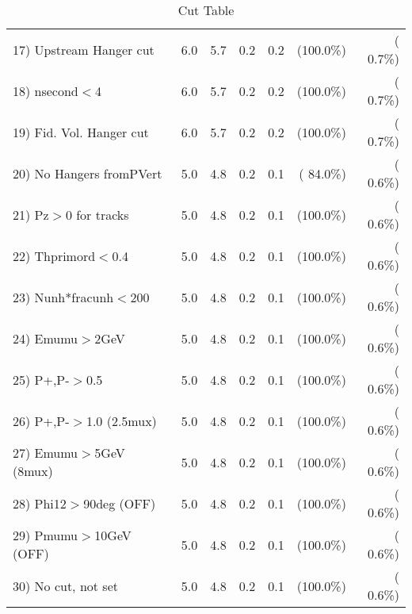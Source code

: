 \begin{table}[h!]
\begin{tabular}{||l||r|r|r|r|r|r||}
 17) Upstream Hanger cut  &          6.0 &          5.7 &          0.2 &          0.2 & (100.0\%) & (  0.7\%) \\
 18) nsecond$<$4          &          6.0 &          5.7 &          0.2 &          0.2 & (100.0\%) & (  0.7\%) \\
 19) Fid. Vol. Hanger cut &          6.0 &          5.7 &          0.2 &          0.2 & (100.0\%) & (  0.7\%) \\
 20) No Hangers fromPVert &          5.0 &          4.8 &          0.2 &          0.1 & ( 84.0\%) & (  0.6\%) \\
 21) Pz$>$0 for tracks    &          5.0 &          4.8 &          0.2 &          0.1 & (100.0\%) & (  0.6\%) \\
 22) Thprimord$<$0.4      &          5.0 &          4.8 &          0.2 &          0.1 & (100.0\%) & (  0.6\%) \\
 23) Nunh*fracunh$<$200   &          5.0 &          4.8 &          0.2 &          0.1 & (100.0\%) & (  0.6\%) \\
 24) Emumu$>$2GeV         &          5.0 &          4.8 &          0.2 &          0.1 & (100.0\%) & (  0.6\%) \\
 25) P+,P-$>$0.5          &          5.0 &          4.8 &          0.2 &          0.1 & (100.0\%) & (  0.6\%) \\
 26) P+,P-$>$1.0 (2.5mux) &          5.0 &          4.8 &          0.2 &          0.1 & (100.0\%) & (  0.6\%) \\
 27) Emumu$>$5GeV  (8mux) &          5.0 &          4.8 &          0.2 &          0.1 & (100.0\%) & (  0.6\%) \\
 28) Phi12$>$90deg  (OFF) &          5.0 &          4.8 &          0.2 &          0.1 & (100.0\%) & (  0.6\%) \\
 29) Pmumu$>$10GeV  (OFF) &          5.0 &          4.8 &          0.2 &          0.1 & (100.0\%) & (  0.6\%) \\
 30) No cut, not set      &          5.0 &          4.8 &          0.2 &          0.1 & (100.0\%) & (  0.6\%) \\
 \hline
 \hline
 \end{tabular}
 \caption{Cut Table           }
 \label{tab-cutcohjpsi-mumu_cohrho0}
 \end{table}
